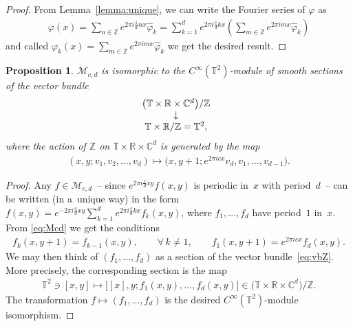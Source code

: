 \documentclass[pdftex]{sigma}
\numberwithin{equation}{section}
\newtheorem{prop}[thm]{Proposition}
\theoremstyle{definition}
\newcommand{\R}{\mathbb{R}}
\newcommand{\C}{\mathbb{C}}
\newcommand{\Z}{\mathbb{Z}}
\newcommand{\T}{\mathbb{T}}
\begin{document}
\begin{proof}
From Lemma~\ref{lemma:unique},
we can write the Fourier series of $\varphi$ as
\begin{gather*}
\varphi(x)=
\sum_{n\in\Z}e^{2\pi i\frac{1}{d}nx}\hat\varphi_k
=\sum_{k=1}^de^{2\pi i\frac{c}{d}kx}\left(\sum_{m\in\Z}e^{2\pi imx}\hat\varphi_k\right)
\end{gather*}
and called $\varphi_k(x)=\sum\limits_{m\in\Z}e^{2\pi imx}\hat\varphi_k$ we get the desired result.
\end{proof}

\begin{prop}
$\mathcal{M}_{c,d}$ is isomorphic to the $C^\infty(\T^2)$-module of smooth sections of the vector bundle
\begin{gather}\label{eq:vbZ}
\begin{array}{@{}c}
\big(\T\times\R\times\C^d\big)/\Z
\\
\downarrow
\\
\T\times\R/\Z=\T^2,
\end{array}
\end{gather}
where the action of $\Z$ on $\T\times\R\times\C^d$ is generated by the map
\begin{gather*}
(x,y;v_1,v_2,\ldots,v_d)\mapsto
\big(x,y+1;e^{2\pi icx}v_d,v_1,\ldots,v_{d-1}\big) .
\end{gather*}
\end{prop}

\begin{proof}
Any $f\in\mathcal{M}_{c,d}$~-- since $e^{2\pi i\frac{c}{d}xy}f(x,y)$ is periodic in~$x$ with period~$d$~-- can be written (in a~unique way) in the form $f(x,y)=e^{-2\pi i\frac{c}{d}xy}\sum\limits_{k=1}^de^{2\pi i\frac{c}{d}kx}f_k(x,y)$, where $f_1,\ldots,f_d$ have period~$1$ in~$x$.
From \eqref{eq:Mcd} we get the conditions
\begin{gather*}
f_k(x,y+1)=f_{k-1}(x,y) ,\qquad\forall\, k\neq 1,
\qquad
f_1(x,y+1)=e^{2\pi icx}f_d(x,y) .
\end{gather*}
We may then think of $(f_1,\ldots,f_d)$ as a section of the vector bundle~\eqref{eq:vbZ}.
More precisely, the corresponding section is the map
\begin{gather*}
\T^2\ni [x,y]\mapsto \big[[x],y;f_1(x,y),\ldots,f_d(x,y)\big] \in \big(\T\times\R\times\C^d\big)/\Z.
\end{gather*}
The transformation $f\mapsto (f_1,\ldots,f_d)$ is the desired $C^\infty(\T^2)$-module isomorphism.
\end{proof}
\end{document}

